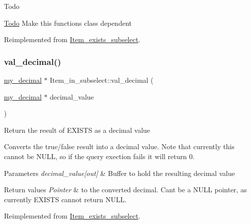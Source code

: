 \begin{DoxyRefDesc}{Todo}
\item[\mbox{\hyperlink{todo__todo000026}{Todo}}]Make this functions class dependent \end{DoxyRefDesc}


Reimplemented from \mbox{\hyperlink{classItem__exists__subselect_a2ca1dbb0f70d442c43e5360933a5a44d}{Item\+\_\+exists\+\_\+subselect}}.

\mbox{\label{classItem__in__subselect_a836c4419eaf559098971462e924ffb3d}} 
\subsubsection{\texorpdfstring{val\+\_\+decimal()}{val\_decimal()}}
{\footnotesize\ttfamily \mbox{\hyperlink{classmy__decimal}{my\+\_\+decimal}} $\ast$ Item\+\_\+in\+\_\+subselect\+::val\+\_\+decimal (\begin{DoxyParamCaption}\item[{\mbox{\hyperlink{classmy__decimal}{my\+\_\+decimal}} $\ast$}]{decimal\+\_\+value }\end{DoxyParamCaption})\hspace{0.3cm}{\ttfamily [virtual]}}

Return the result of E\+X\+I\+S\+TS as a decimal value

Converts the true/false result into a decimal value. Note that currently this cannot be N\+U\+LL, so if the query exection fails it will return 0.


\begin{DoxyParams}{Parameters}
{\em decimal\+\_\+value\mbox{[}out\mbox{]}} & Buffer to hold the resulting decimal value \\
\hline
\end{DoxyParams}

\begin{DoxyRetVals}{Return values}
{\em Pointer} & to the converted decimal. Can\textquotesingle{}t be a N\+U\+LL pointer, as currently E\+X\+I\+S\+TS cannot return N\+U\+LL. \\
\hline
\end{DoxyRetVals}


Reimplemented from \mbox{\hyperlink{classItem__exists__subselect_aa9f79b931ce496a3f4f962c2f325bee6}{Item\+\_\+exists\+\_\+subselect}}.

